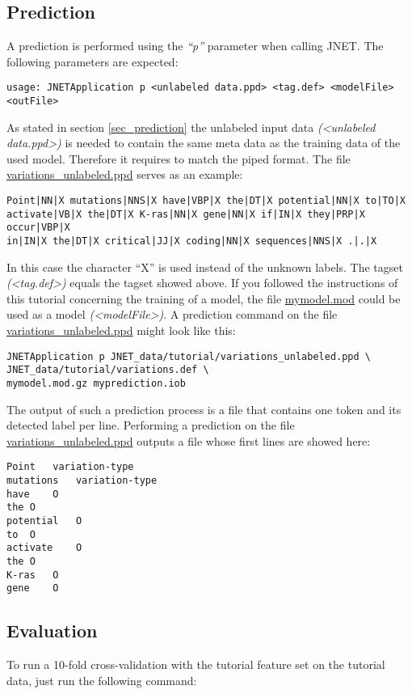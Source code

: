 \documentclass[11pt,a4paper,halfparskip]{scrartcl}
\begin{document}
\subsection{Prediction}
A prediction is performed using the \textit{``p''} parameter when calling JNET.
The following parameters are expected:

\begin{verbatim}
usage: JNETApplication p <unlabeled data.ppd> <tag.def> <modelFile>
<outFile>
\end{verbatim}

As stated in section \ref{sec_prediction} the unlabeled input data
\textit{(<unlabeled data.ppd>)} is needed to contain the same meta data as the
training data of the used model. Therefore it requires to match the piped
format. The file \url{variations_unlabeled.ppd} serves as an example:

\begin{verbatim}
Point|NN|X mutations|NNS|X have|VBP|X the|DT|X potential|NN|X to|TO|X
activate|VB|X the|DT|X K-ras|NN|X gene|NN|X if|IN|X they|PRP|X occur|VBP|X
in|IN|X the|DT|X critical|JJ|X coding|NN|X sequences|NNS|X .|.|X
\end{verbatim}

In this case the character ``X'' is used instead of the unknown labels.
The tagset \textit{(<tag.def>)} equals the tagset showed above.
If you followed the instructions of this tutorial
concerning the training of a model, the file
\url{mymodel.mod} could be used as a model \textit{(<modelFile>)}.
A prediction command on the file \url{variations_unlabeled.ppd} might look like
this:
\begin{verbatim}
JNETApplication p JNET_data/tutorial/variations_unlabeled.ppd \
JNET_data/tutorial/variations.def \
mymodel.mod.gz myprediction.iob
\end{verbatim}

The output of such a prediction process is a file that contains one token and its
detected label per line. Performing a prediction on the file
\url{variations_unlabeled.ppd} outputs a file whose first lines are showed here:

\begin{verbatim}
Point	variation-type
mutations	variation-type
have	O
the	O
potential	O
to	O
activate	O
the	O
K-ras	O
gene	O
\end{verbatim}

\subsection{Evaluation}
To run a 10-fold cross-validation with the tutorial feature set on the
tutorial data, just run the following command:
\end{document}
